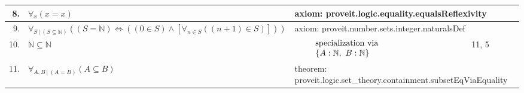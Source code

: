 \documentclass{article}
\begin{document}
\begin{tabular}{rl|l|l|l}
\hline
8. & $\forall_{ x } \left(x = x\right)$ & \multicolumn{3}{|l}{axiom: proveit.logic.equality.equalsReflexivity} \\
\hline
9. & $\forall_{ S ~|~ \left(S \subseteq \mathbb{N}\right) } \left(\left(S = \mathbb{N}\right) \Leftrightarrow \left( \left(0 \in S\right) \land \left[\forall_{ n  \in S} \left(\left( n + 1 \right) \in S\right)\right] \right)\right)$ & \multicolumn{3}{|l}{axiom: proveit.number.sets.integer.naturalsDef} \\
\hline
10. & $\mathbb{N} \subseteq \mathbb{N}$ &  & $\begin{array}{l} {\rm specialization~via} \\ \left\{A: \mathbb{N},~B: \mathbb{N}\right\}\end{array}$ & 11, 5 \\
\hline
11. & $\forall_{ A , B ~|~ \left(A = B\right) } \left(A \subseteq B\right)$ & \multicolumn{3}{|l}{theorem: proveit.logic.set\_theory.containment.subsetEqViaEquality} \\
\hline
\end{tabular}
\end{document}
